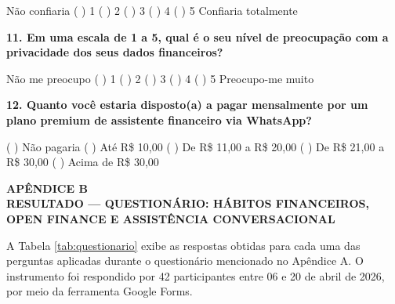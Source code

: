 \vspace{4pt}
Não confiaria \quad ( ) 1 \quad ( ) 2 \quad ( ) 3 \quad ( ) 4 \quad ( ) 5 \quad Confiaria totalmente

\vspace{10pt}

\textbf{11. Em uma escala de 1 a 5, qual é o seu nível de preocupação com a privacidade dos seus dados financeiros?}

\vspace{4pt}
Não me preocupo \quad ( ) 1 \quad ( ) 2 \quad ( ) 3 \quad ( ) 4 \quad ( ) 5 \quad Preocupo-me muito

\vspace{10pt}

\textbf{12. Quanto você estaria disposto(a) a pagar mensalmente por um plano premium de assistente financeiro via WhatsApp?}

\vspace{4pt}
( ) Não pagaria \quad ( ) Até R\$ 10,00 \quad ( ) De R\$ 11,00 a R\$ 20,00 \quad ( ) De R\$ 21,00 a R\$ 30,00 \quad ( ) Acima de R\$ 30,00

\newpage
{}

\begin{center}
    \fontsize{14pt}{14pt}\selectfont\bfseries APÊNDICE B\\[12pt]
    \fontsize{12pt}{12pt}\selectfont RESULTADO — QUESTIONÁRIO: HÁBITOS FINANCEIROS, OPEN FINANCE E ASSISTÊNCIA CONVERSACIONAL
\end{center}

\vspace{12pt}

A Tabela \ref{tab:questionario} exibe as respostas obtidas para cada uma das perguntas aplicadas durante o questionário mencionado no Apêndice A. O instrumento foi respondido por 42 participantes entre 06 e 20 de abril de 2026, por meio da ferramenta Google Forms.

\vspace{10pt}

\renewcommand{\tablename}{Tabela}
\setcounter{table}{0}
\label{tab:questionario}

